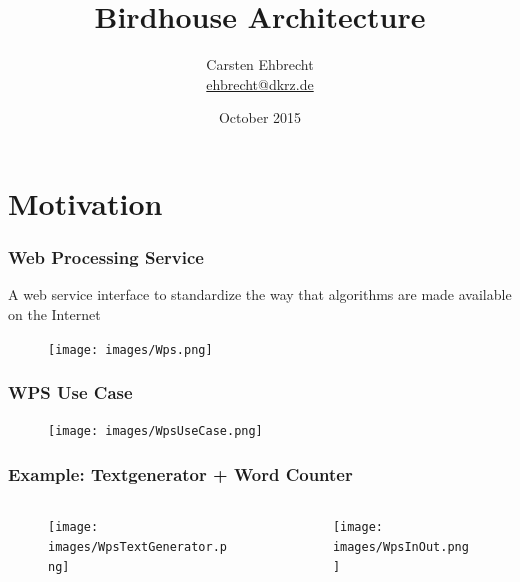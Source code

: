 \documentclass{beamer}
\title{Birdhouse Architecture}
\author{
Carsten Ehbrecht\\
\medskip
{\scriptsize \url{ehbrecht@dkrz.de}}
}
\institute{German Climate Computing Center (DKRZ)}
\date{October 2015}
\begin{document}

  \begin{frame}[plain]
    \titlepage
  \end{frame}




  \section{Motivation}

  \begin{frame}[plain]
    \frametitle{Web Processing Service}
    A web service interface to standardize the way that algorithms are made available on the Internet
    \begin{figure}
      \texttt{[image: images/Wps.png]}
    \end{figure}
  \end{frame}


  \begin{frame}[plain]
    \frametitle{WPS Use Case}
    \begin{figure}
      \texttt{[image: images/WpsUseCase.png]}
    \end{figure}
  \end{frame}


  \begin{frame}[plain]
    \frametitle{Example: Textgenerator + Word Counter}
    \begin{columns}[T] %
      \begin{column}[T]{5cm} %
        \begin{figure}
          \texttt{[image: images/WpsTextGenerator.png]}
        \end{figure}
      \end{column}
      \begin{column}[T]{5cm} %
        \begin{figure}
          \texttt{[image: images/WpsInOut.png]}
        \end{figure}
      \end{column}
    \end{columns}
  \end{frame}
\end{document}
